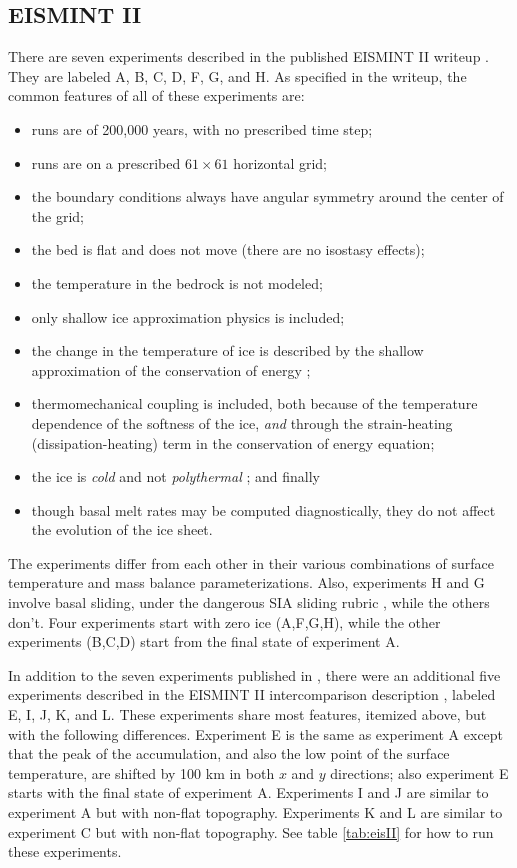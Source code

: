 \documentclass[11pt,final]{amsart}
\begin{document}
\subsection{EISMINT II}\label{subsect:EISMINTII}  There are seven experiments described in the published EISMINT II writeup \cite{EISMINT00}.  They are labeled A, B, C, D, F, G, and H.  As specified in the writeup, the common features of all of these experiments are:\begin{itemize}
\item runs are of 200,000 years, with no prescribed time step;
\item runs are on a prescribed $61\times 61$ horizontal grid;
\item the boundary conditions always have angular symmetry around the center of the grid;
\item the bed is flat and does not move (there are no isostasy effects);
\item the temperature in the bedrock is not modeled;
\item only shallow ice approximation physics is included;
\item the change in the temperature of ice is described by the shallow approximation of the conservation of energy \cite{Fowler};
\item thermomechanical coupling is included, both because of the temperature dependence of the softness of the ice, \emph{and} through the strain-heating (dissipation-heating) term in the conservation of energy equation;
\item the ice is \emph{cold} and not \emph{polythermal} \cite{Greve}; and finally
\item though basal melt rates may be computed diagnostically, they do not affect the evolution of the ice sheet.
\end{itemize}
The experiments differ from each other in their various combinations of surface temperature and mass balance parameterizations.  Also, experiments H and G involve basal sliding, under the dangerous SIA sliding rubric \cite[Appendix B]{BBssasliding}, while the others don't.  Four experiments start with zero ice (A,F,G,H), while the other experiments (B,C,D) start from the final state of experiment A.

In addition to the seven experiments published in \cite{EISMINT00}, there were an additional five experiments described in the EISMINT II intercomparison description 
\cite{EISIIdescribe}, labeled E, I, J, K, and L.  These experiments share most features, itemized above, but with the following differences.  Experiment E is the same as experiment A except that the peak of the accumulation, and also the low point of the surface temperature, are shifted by 100 km in both $x$ and $y$ directions; also experiment E starts with the final state of experiment A.  Experiments I and J are similar to experiment A but with non-flat topography.  Experiments K and L are similar to experiment C but with non-flat topography.  See table \ref{tab:eisII} for how to run these experiments.
\end{document}
